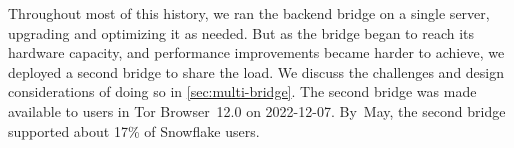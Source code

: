 \documentclass[letterpaper,twocolumn]{article}
\begin{document}
Throughout most of this history,
we ran the backend bridge on a single server,
upgrading and optimizing it as needed.
But as the bridge began to reach its hardware capacity,
and performance improvements became harder to achieve,
we deployed a second bridge to share the load.
We discuss the challenges and design considerations of doing so in \autoref{sec:multi-bridge}.
The second bridge was made available to users in
Tor Browser~12.0 on \mbox{2022-12-07}.
By~May, the second bridge supported about 17\% of Snowflake users.
\end{document}
